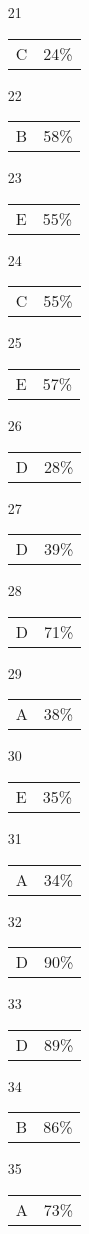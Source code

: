 \documentclass[12pt]{article}
\begin{document}
\begin{multicols}{5}
\begin{enumerate}
\item[21] \begin{tabular}{cc} C & 24\%\end{tabular}
\item[22] \begin{tabular}{cc} B & 58\%\end{tabular}
\item[23] \begin{tabular}{cc} E & 55\%\end{tabular}
\item[24] \begin{tabular}{cc} C & 55\%\end{tabular}
\item[25] \begin{tabular}{cc} E & 57\%\end{tabular}
\item[]
\item[26] \begin{tabular}{cc} D & 28\%\end{tabular}
\item[27] \begin{tabular}{cc} D & 39\%\end{tabular}
\item[28] \begin{tabular}{cc} D & 71\%\end{tabular}
\item[29] \begin{tabular}{cc} A & 38\%\end{tabular}
\item[30] \begin{tabular}{cc} E & 35\%\end{tabular}
\item[]
\item[31] \begin{tabular}{cc} A & 34\%\end{tabular}
\item[32] \begin{tabular}{cc} D & 90\%\end{tabular}
\item[33] \begin{tabular}{cc} D & 89\%\end{tabular}
\item[34] \begin{tabular}{cc} B & 86\%\end{tabular}
\item[35] \begin{tabular}{cc} A & 73\%\end{tabular}

\end{enumerate}
\end{multicols}
\end{document}
